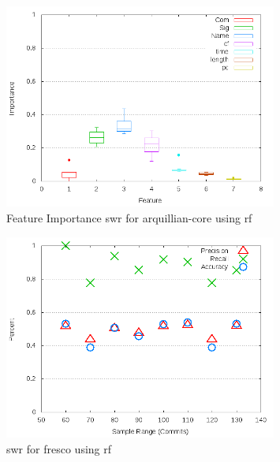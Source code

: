 \begin{figure}[!t]
\centering
\includegraphics[width=0.8\textwidth]{images/rf/test_1/arquillian-core_importance.png}
\caption{Feature Importance \gls{swr} for arquillian-core using \gls{rf}}
\label{fig:test_1_arquillian-core_rf_importance}
\end{figure}

\begin{figure}[!t]
\centering
\includegraphics[width=0.8\textwidth]{images/rf/test_1/fresco_sample_range.png}
\caption{\gls{swr} for fresco using \gls{rf}}
\label{fig:test_1_fresco_rf}
\end{figure}

